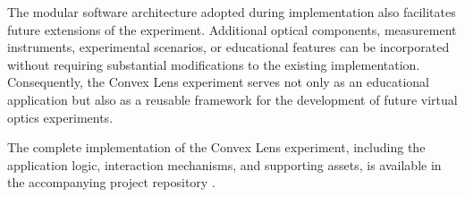 The modular software architecture adopted during implementation also facilitates future extensions of the experiment. Additional optical components, measurement instruments, experimental scenarios, or educational features can be incorporated without requiring substantial modifications to the existing implementation. Consequently, the Convex Lens experiment serves not only as an educational application but also as a reusable framework for the development of future virtual optics experiments.

The complete implementation of the Convex Lens experiment, including the application logic, interaction mechanisms, and supporting assets, is available in the accompanying project repository \cite{thesisRepo}.